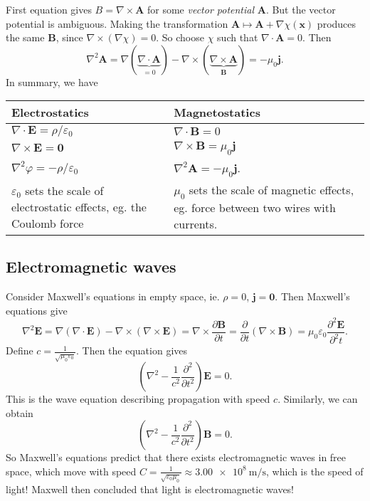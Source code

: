 \documentclass[a4paper]{article}
\begin{document}
First equation gives $B = \nabla \times \mathbf{A}$ for some \emph{vector potential} $\mathbf{A}$. But the vector potential is ambiguous. Making the transformation $\mathbf{A}\mapsto \mathbf{A} + \nabla \chi(\mathbf{x})$ produces the same $\mathbf{B}$, since $\nabla\times (\nabla \chi) = 0$. So choose $\chi$ such that $\nabla\cdot \mathbf{A} = 0$. Then 
\[
  \nabla^2 \mathbf{A} = \nabla(\underbrace{\nabla\cdot \mathbf{A}}_{=0}) - \nabla\times (\underbrace{\nabla\times \mathbf{A}}_{\mathbf{B}}) = -\mu_0 \mathbf{j}.
\]
In summary, we have

\noindent\begin{tabularx}{\textwidth}{XX}
  \toprule
  Electrostatics & Magnetostatics\\
  \midrule
  $\nabla\cdot \mathbf{E} = \rho/\varepsilon_0$ & $\nabla\cdot \mathbf{B} = 0$\\
  $\nabla\times \mathbf{E} = \mathbf{0}$ & $\nabla\times \mathbf{B} = \mu_0 \mathbf{j}$\\
  $\nabla^2 \varphi = -\rho/\varepsilon_0$ & $\nabla^2 \mathbf{A} = -\mu_0 \mathbf{j}$.\\
  $\varepsilon_0$ sets the scale of electrostatic effects, eg. the Coulomb force & $\mu_0$ sets the scale of magnetic effects, eg. force between two wires with currents.\\
  \bottomrule
\end{tabularx}

\subsection{Electromagnetic waves}
Consider Maxwell's equations in empty space, ie. $\rho = 0$, $\mathbf{j} = \mathbf{0}$. Then Maxwell's equations give
\[
  \nabla^2 \mathbf{E} = \nabla(\nabla\cdot \mathbf{E}) - \nabla\times (\nabla\times \mathbf{E}) = \nabla\times \frac{\partial \mathbf{B}}{\partial t} = \frac{\partial}{\partial t} (\nabla \times \mathbf{B}) = \mu_0\varepsilon_0 \frac{\partial^2 \mathbf{E}}{\partial^2 t}.
\]
Define $c = \frac{1}{\sqrt{\mu_0\varepsilon_0}}$. Then the equation gives
\[
  \left(\nabla^2 - \frac{1}{c^2}\frac{\partial^2}{\partial t^2}\right)\mathbf{E} = 0.
\]
This is the wave equation describing propagation with speed $c$. Similarly, we can obtain
\[
  \left(\nabla^2 - \frac{1}{c^2}\frac{\partial^2}{\partial t^2}\right)\mathbf{B} = 0.
\]
So Maxwell's equations predict that there exists electromagnetic waves in free space, which move with speed $C = \frac{1}{\sqrt{\varepsilon_0 \mu_0}} \approx \SI{3.00e8}{\meter\per\second}$, which is the speed of light! Maxwell then concluded that light is electromagnetic waves!
\end{document}

